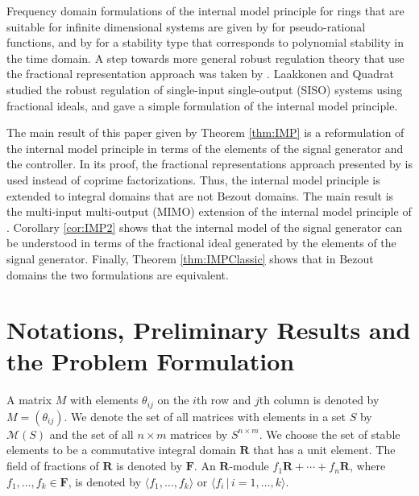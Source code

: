 \documentclass[11pt, a4paper]{amsart}
\newcommand{\matrices}[1]{\mathcal{M}\left( #1 \right)}		%
\newcommand{\gen}{\theta}									%
\newcommand{\stable}{\mathbf{R}}							%
\newcommand{\fractions}[1]{\mathbf{F}} %
\begin{document}
Frequency domain formulations of the internal model principle for rings that are suitable for infinite dimensional systems are given by \cite{YamamotoHara1988} for pseudo-rational functions, and by \cite{LaakkonenPohjolainen2015} for a stability type that corresponds to polynomial stability in the time domain. A step towards more general robust regulation theory that use the fractional representation approach was taken by \cite{LaakkonenQuadrat2015}. Laakkonen and Quadrat studied the robust regulation of single-input single-output (SISO) systems using fractional ideals, and gave a simple formulation of the internal model principle.

The main result of this paper given by Theorem \ref{thm:IMP} is a reformulation of the internal model principle in terms of the elements of the signal generator and the controller. In its proof, the fractional representations approach presented by \cite{Quadrat2006} is used instead of coprime factorizations. Thus, the internal model principle is extended to integral domains that are not Bezout domains. The main result is the multi-input multi-output (MIMO) extension of the internal model principle of \cite{LaakkonenQuadrat2015}. Corollary \ref{cor:IMP2} shows that the internal model of the signal generator can be understood in terms of the fractional ideal generated by the elements of the signal generator. Finally, Theorem \ref{thm:IMPClassic} shows that in Bezout domains the two formulations are equivalent.




\section{Notations, Preliminary Results and the Problem Formulation}\label{sec:Preliminaries}

A matrix $M$ with elements $\gen_{ij}$ on the $i$th row and $j$th column is denoted by $M=(\gen_{ij})$. We denote the set of all matrices with elements in a set $S$ by $\matrices{S}$ and the set of all $n\times m$ matrices by $S^{n\times m}$. We choose the set of stable elements to be a commutative integral domain $\stable$ that has a unit element. The field of fractions of $\stable$ is denoted by $\fractions{\stable}$. An $\stable$-module $f_1 \stable+\cdots+f_n\stable$, where $f_1,\ldots,f_k\in\fractions{\stable}$, is denoted by $\langle f_1,\ldots,f_k\rangle$ or $\langle f_i\, |\, i=1,\ldots, k\rangle$.
\end{document}
